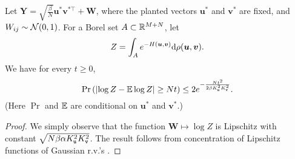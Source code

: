 \documentclass[final,12pt]{colt2018} %
\newcommand{\utt}{\textup{\texttt{u}}}
\newcommand{\vtt}{\textup{\texttt{v}}}
\renewcommand{\u}{\bm{u}}
\renewcommand{\v}{\bm{v}}
\newcommand{\Y}{\bm{Y}}
\newcommand{\W}{\bm{W}}
\begin{document}
\begin{lemma}\label{gaussian_concentration}
Let $\Y = \sqrt{\frac{\beta}{N}}\u^*\v^{*\top} + \W$, where the planted vectors $\u^*$ and $\v^*$ are fixed, and $W_{ij} \sim \mathcal{N}(0,1)$. For a Borel set $A \subset \mathbb{R}^{M+N}$, let  
\[Z = \int_A e^{-H(\u,\v)}\rmd \rho(\u,\v).\]
We have for every $t \ge 0$,
\[\Pr\left(\abs{\log Z - \E\log Z} \ge Nt\right) \le 2 e^{-\frac{Nt^2}{2\beta K_{\utt}^2K_{\vtt}^2}}.\]
(Here $\Pr$ and $\operatorname{\mathbb{E}}$ are conditional on $\u^*$ and $\v^*$.)
\end{lemma}
\begin{proof}
We simply observe that the function $\W \mapsto \log Z$ is Lipschitz with constant $\sqrt{N\beta \alpha K_{\utt}^2K_{\vtt}^2}$. The result follows from concentration of Lipschitz functions of Gaussian r.v.'s \citep[this is the Borell-Tsirelson-Ibragimov-Sudakov inequality; see][Theorem 5.6]{boucheron2013concentration}.
\end{proof}
\end{document}
